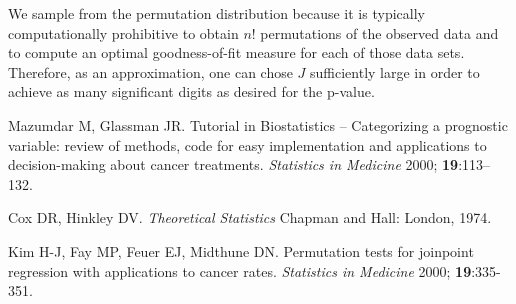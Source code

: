 \documentclass{article}
\begin{document}
We sample from the permutation distribution because it is typically computationally 
prohibitive to obtain $n!$ permutations of the observed data and to compute an 
optimal goodness-of-fit measure for each of those data sets. Therefore, as
an approximation, one can chose $J$ sufficiently large in order to achieve as 
many significant digits as desired for the p-value.

\begin{thebibliography}{99}
Mazumdar M, Glassman JR.
Tutorial in Biostatistics --  Categorizing a prognostic variable: review of methods, code for easy implementation and applications to decision-making about cancer treatments.
\textit{Statistics in Medicine} 2000;
\textbf{19}:113--132.

Cox DR, Hinkley DV.
\textit{Theoretical Statistics}
Chapman and Hall: London, 1974.

Kim H-J, Fay MP, Feuer EJ, Midthune DN.
Permutation tests for joinpoint regression with applications to cancer rates.
\textit{Statistics in Medicine} 2000;
\textbf{19}:335-351.
\end{thebibliography}
\end{document}
